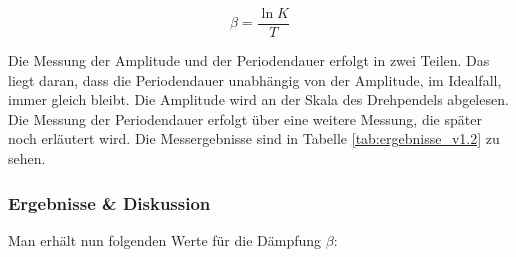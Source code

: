             \begin{equation}
                \beta = \frac{\ln K}{T}
                \label{eq:Dämpfungskonstante}
            \end{equation}

            Die Messung der Amplitude und der Periodendauer erfolgt in zwei Teilen. Das liegt daran, dass die Periodendauer unabhängig von der Amplitude, im Idealfall, immer gleich bleibt. Die Amplitude wird an der Skala des Drehpendels abgelesen. Die Messung der Periodendauer erfolgt über eine weitere Messung, die später noch erläutert wird. Die Messergebnisse sind in Tabelle \ref{tab:ergebnisse_v1.2} zu sehen.


        \subsubsection{Ergebnisse \& Diskussion}

            Man erhält nun folgenden Werte für die Dämpfung $\beta$:
            
